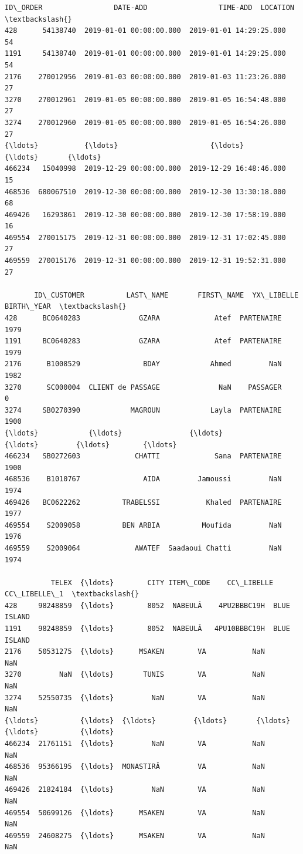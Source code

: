 \documentclass[11pt]{article}
\makeatletter
\newcommand{\boxspacing}{\kern\kvtcb@left@rule\kern\kvtcb@boxsep}
\newcommand{\prompt}[4]{
        \ttfamily\llap{{\color{#2}[#3]:\hspace{3pt}#4}}\vspace{-\baselineskip}
    }
\makeatother
\begin{document}
            \begin{tcolorbox}[breakable, size=fbox, boxrule=.5pt, pad at break*=1mm, opacityfill=0]
\prompt{Out}{outcolor}{6}{\boxspacing}
\begin{Verbatim}[commandchars=\\\{\}]
         ID\_ORDER                 DATE-ADD                 TIME-ADD  LOCATION  \textbackslash{}
428      54138740  2019-01-01 00:00:00.000  2019-01-01 14:29:25.000        54
1191     54138740  2019-01-01 00:00:00.000  2019-01-01 14:29:25.000        54
2176    270012956  2019-01-03 00:00:00.000  2019-01-03 11:23:26.000        27
3270    270012961  2019-01-05 00:00:00.000  2019-01-05 16:54:48.000        27
3274    270012960  2019-01-05 00:00:00.000  2019-01-05 16:54:26.000        27
{\ldots}           {\ldots}                      {\ldots}                      {\ldots}       {\ldots}
466234   15040998  2019-12-29 00:00:00.000  2019-12-29 16:48:46.000        15
468536  680067510  2019-12-30 00:00:00.000  2019-12-30 13:30:18.000        68
469426   16293861  2019-12-30 00:00:00.000  2019-12-30 17:58:19.000        16
469554  270015175  2019-12-31 00:00:00.000  2019-12-31 17:02:45.000        27
469559  270015176  2019-12-31 00:00:00.000  2019-12-31 19:52:31.000        27

       ID\_CUSTOMER          LAST\_NAME       FIRST\_NAME  YX\_LIBELLE BIRTH\_YEAR  \textbackslash{}
428      BC0640283              GZARA             Atef  PARTENAIRE       1979
1191     BC0640283              GZARA             Atef  PARTENAIRE       1979
2176      B1008529               BDAY            Ahmed         NaN       1982
3270      SC000004  CLIENT de PASSAGE              NaN    PASSAGER          0
3274     SB0270390            MAGROUN            Layla  PARTENAIRE       1900
{\ldots}            {\ldots}                {\ldots}              {\ldots}         {\ldots}        {\ldots}
466234   SB0272603             CHATTI             Sana  PARTENAIRE       1900
468536    B1010767               AIDA         Jamoussi         NaN       1974
469426   BC0622262          TRABELSSI           Khaled  PARTENAIRE       1977
469554    S2009058          BEN ARBIA          Moufida         NaN       1976
469559    S2009064             AWATEF  Saadaoui Chatti         NaN       1974

           TELEX  {\ldots}        CITY ITEM\_CODE    CC\_LIBELLE CC\_LIBELLE\_1  \textbackslash{}
428     98248859  {\ldots}        8052  NABEULÂ    4PU2BBBC19H  BLUE ISLAND
1191    98248859  {\ldots}        8052  NABEULÂ   4PU10BBBC19H  BLUE ISLAND
2176    50531275  {\ldots}      MSAKEN        VA           NaN          NaN
3270         NaN  {\ldots}       TUNIS        VA           NaN          NaN
3274    52550735  {\ldots}         NaN        VA           NaN          NaN
{\ldots}          {\ldots}  {\ldots}         {\ldots}       {\ldots}           {\ldots}          {\ldots}
466234  21761151  {\ldots}         NaN        VA           NaN          NaN
468536  95366195  {\ldots}  MONASTIRÂ         VA           NaN          NaN
469426  21824184  {\ldots}         NaN        VA           NaN          NaN
469554  50699126  {\ldots}      MSAKEN        VA           NaN          NaN
469559  24608275  {\ldots}      MSAKEN        VA           NaN          NaN


\end{Verbatim}
\end{tcolorbox}
\end{document}
